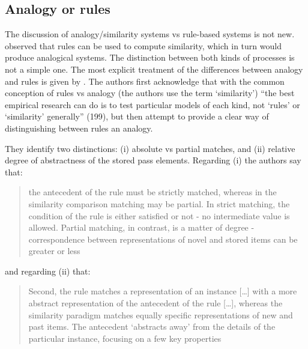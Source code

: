 \subsection{Analogy or rules}


The discussion of analogy/similarity systems vs rule-based systems is not new. \textcite{Nosofsky.1989} observed that rules can be used to compute similarity, which in turn would produce analogical systems. The distinction between both kinds of processes is not a simple one. The most explicit treatment of the differences between analogy and rules is given by \textcite{Hahn.1998}. The authors first acknowledge that with the common conception of rules vs analogy (the authors use the term `similarity') ``the best empirical research can do is to test particular models of each kind, not `rules' or `similarity' generally'' (199), but then attempt to provide a clear way of distinguishing between rules an analogy.

They identify two distinctions: (i) absolute vs partial matches, and (ii) relative degree of abstractness of the stored pass elements. Regarding (i) the authors say that:

\begin{quotation}
the antecedent of the rule must be strictly matched, whereas in the similarity comparison matching may be partial. In strict matching, the condition of the rule is either  satisfied  or  not  - no  intermediate  value  is  allowed.  Partial  matching,  in contrast, is a matter of degree - correspondence between representations of novel and  stored  items  can  be  greater  or less \autocite[202]{Hahn.1998}
\end{quotation}

and regarding (ii) that:

\begin{quotation}
  Second,  the  rule  matches  a  representation  of  an  instance [\dots] with a more abstract representation of the antecedent of the rule [\dots], whereas the similarity paradigm matches equally specific representations of new and past items. The antecedent ‘abstracts away’ from the details of the particular instance, focusing on a few key properties \autocite[202]{Hahn.1998}
\end{quotation}

